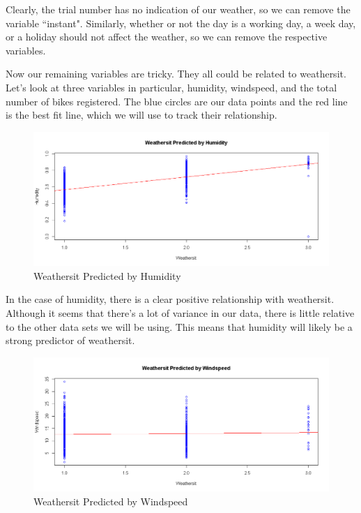 \documentclass[12pt]{article}
\begin{document}
Clearly, the trial number has no indication of our weather, so we can remove the variable ``instant". Similarly, whether or not the day is a working day, a week day, or a holiday should not affect the weather, so we can remove the respective variables. 

Now our remaining variables are tricky. They all could be related to weathersit. Let's look at three variables in particular, humidity, windspeed, and the total number of bikes registered. The blue circles are our data points and the red line is the best fit line, which we will use to track their relationship.

\begin{figure}[H]
	\centering
  	\includegraphics[width=150mm]{"Weathersit Predicted by Humidity"}
 	\caption{Weathersit Predicted by Humidity}
 	\label{Weathersit Predicted by Humidity}
\end{figure}

In the case of humidity, there is a clear positive relationship with weathersit. Although it seems that there's
a lot of variance in our data, there is little relative to the other data sets we will be using. This means that humidity will likely be a strong predictor of weathersit.

\begin{figure}[H]
	\centering
  	\includegraphics[width=150mm]{"Weathersit Predicted by Windspeed"}
 	\caption{Weathersit Predicted by Windspeed}
 	\label{Weathersit Predicted by Windspeed}
\end{figure}
\end{document}
